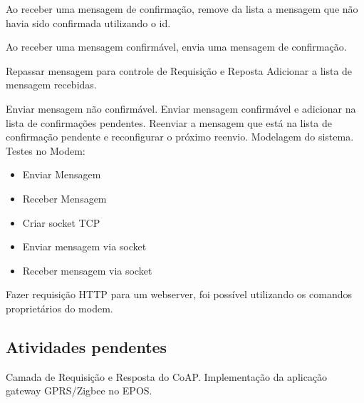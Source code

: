 Ao receber uma mensagem de confirma\c{c}\~ao, remove da lista a mensagem que n\~ao havia sido confirmada utilizando o id.

Ao receber uma mensagem confirm\'avel, envia uma mensagem de confirma\c{c}\~ao.

Repassar mensagem para controle de Requisi\c{c}\~ao e Reposta Adicionar a lista de mensagem recebidas.

Enviar mensagem n\~ao confirm\'avel.
Enviar mensagem confirm\'avel e adicionar na lista de confirma\c{c}\~oes pendentes.
Reenviar a mensagem que est\'a na lista de confirma\c{c}\~ao pendente e reconfigurar o pr\'oximo reenvio.
Modelagem do sistema.
Testes no Modem:
\begin{itemize}
    \item Enviar Mensagem
    \item Receber Mensagem
    \item Criar socket TCP
    \item Enviar mensagem via socket
    \item Receber mensagem via socket
\end{itemize}

Fazer requisi\c{c}\~ao HTTP para um webserver, foi poss\'ivel utilizando os comandos propriet\'arios do modem.

\subsection{Atividades pendentes}
Camada de Requisi\c{c}\~ao e Resposta do CoAP.
Implementa\c{c}\~ao da aplica\c{c}\~ao gateway GPRS/Zigbee no EPOS.
